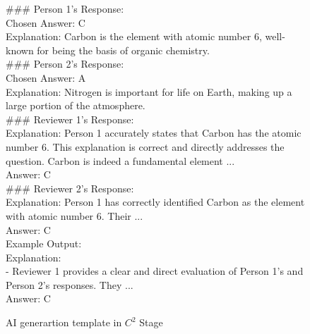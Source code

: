 \begin{figure*}[h]
\begin{tcolorbox}[colframe=cyan!40!black, title=\textbf{Prompt for $C^2$ Generation}]
  \#\#\# Person 1's Response:\\
  Chosen Answer: C\\
  Explanation: Carbon is the element with atomic number 6, well-known for being the basis of organic chemistry.\\
  \#\#\# Person 2's Response:\\
  Chosen Answer: A\\
  Explanation: Nitrogen is important for life on Earth, making up a large portion of the atmosphere.\\
  \#\#\# Reviewer 1's Response:\\
  Explanation: Person 1 accurately states that Carbon has the atomic number 6. This explanation is correct and directly addresses the question. Carbon is indeed a fundamental element ...\\
  Answer: C\\
  \#\#\# Reviewer 2's Response:\\
  Explanation: Person 1 has correctly identified Carbon as the element with atomic number 6. Their ...\\
  Answer: C\\

  Example Output:\\
  Explanation: \\
  - Reviewer 1 provides a clear and direct evaluation of Person 1's and Person 2's responses. They ...\\
  Answer: C


\end{tcolorbox}
\caption{AI generartion template in $C^2$ Stage}
\label{prompt:coc}
\end{figure*}